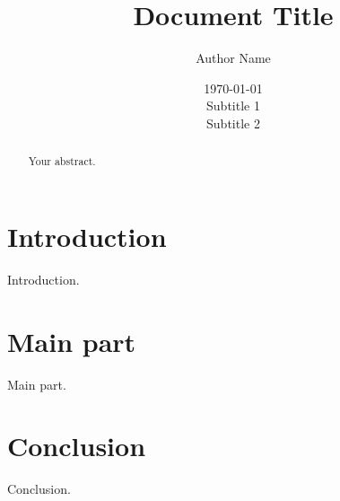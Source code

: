 \documentclass[]{report}
\title{Document Title}
\author{Author Name}
\date{\today \\Subtitle 1 \\Subtitle 2}
\begin{document}
\maketitle

\begin{abstract}
    Your abstract.
\end{abstract}


\setcounter{tocdepth}{3} %
\tableofcontents
\newpage

\listoffigures
\newpage

\listoftables
\newpage

\printnoidxglossaries
\cleardoublepage
{}

\section{Introduction}
Introduction.

\section{Main part}
Main part.

\section{Conclusion}
Conclusion.

\printbibliography[title=References]
\end{document}

